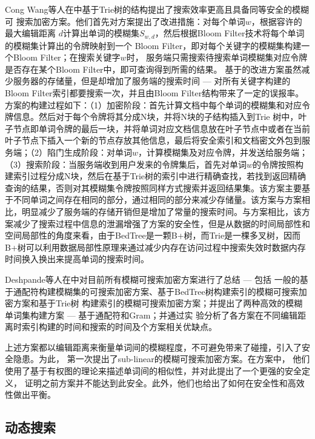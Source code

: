 Cong Wang等人在\cite{wang2012achieving}中基于Trie树的结构提出了搜索效率更高且具备同等安全的模糊可
搜索加密方案。他们首先对方案\cite{li2010fuzzy}提出了改进措施：对每个单词$w$，根据容许的最大编辑距离
$d$计算出单词的模糊集$S_{w,d}$，然后根据Bloom Filter技术将每个单词的模糊集计算出的令牌映射到一个
Bloom Filter，即对每个关键字的模糊集构建一个Bloom Filter；在搜索关键字$w$时，
服务端只需搜索待搜索单词模糊集对应令牌是否存在某个Bloom Filter中，即可查询得到所需的结果。
基于\cite{li2010fuzzy}的改进方案虽然减少服务器的存储量，但是却增加了服务端的搜索时间 ---
对所有关键字构建的Bloom Filter索引都要搜索一次，并且由Bloom Filter结构带来了一定的误报率。
方案的构建过程如下：（1）加密阶段：首先计算文档中每个单词的模糊集和对应令牌信息。然后对于每个令牌将其分成N块，并将N块的子结构插入到Trie 树中，叶子节点即单词令牌的最后一块，并将单词对应文档信息放在叶子节点中或者在当前叶子节点下插入一个新的节点存放其他信息，最后将安全索引和文档密文外包到服务端；（2）陷门生成阶段：对单词$w$，计算模糊集及对应令牌，并发送给服务端；（3）搜索阶段：当服务端收到用户发来的令牌集后，首先对单词$w$的令牌按照构建索引过程分成N块，然后在基于Trie树的索引中进行精确查找，若找到返回精确查询的结果，否则对其模糊集令牌按照同样方式搜索并返回结果集。该方案主要基于不同单词之间存在相同的部分，通过相同的部分来减少存储量。该方案与方案\cite{li2010fuzzy}相比，明显减少了服务端的存储开销但是增加了常量的搜索时间。与方案\cite{chuah2011privacy}相比，该方案减少了搜索过程中信息的泄漏增强了方案的安全性，但是从数据的时间局部性和空间局部性的角度来看，由于BedTree是一颗B+树，而Trie是一棵多叉树，因而B+树可以利用数据局部性原理来通过减少内存在访问过程中搜索失效时数据内存时间换入换出来提高单词的搜索时间。

Deshpande等人在\cite{balamuralikrishna2013fuzzy}中对目前所有模糊可搜索加密方案进行了总结 --- 包括
一般的基于通配符构建模糊集的可搜索加密方案、基于BedTree树构建索引的模糊可搜索加密方案和基于Trie树
构建索引的模糊可搜索加密方案；并提出了两种高效的模糊单词集构建方案 --- 基于通配符和Gram；并通过实
验分析了各方案在不同编辑距离时索引构建的时间和搜索的时间及个方案相关优缺点。

上述方案都以编辑距离来衡量单词间的模糊程度，不可避免带来了碰撞，引入了安全隐患。为此，
\cite{boldyreva2014efficient}第一次提出了sub-linear的模糊可搜索加密方案。在方案中，
他们使用了基于有权图的理论来描述单词间的相似性，并对此提出了一个更强的安全定义，
证明之前方案并不能达到此安全。此外，他们也给出了如何在安全性和高效性做出平衡。

\subsection{动态搜索}
\label{sec:search_symm_symm_dynamic}

